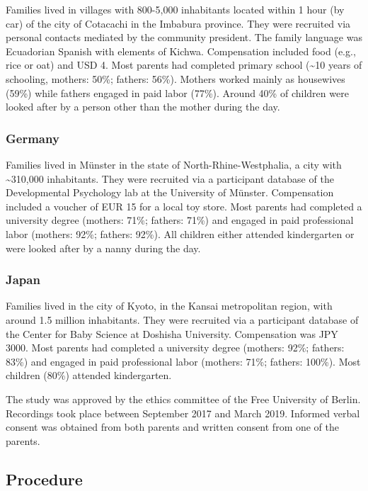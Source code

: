 \documentclass[
  man,floatsintext]{apa6}
\begin{document}
Families lived in villages with 800-5,000 inhabitants located within 1 hour (by car) of the city of Cotacachi in the Imbabura province. They were recruited via personal contacts mediated by the community president. The family language was Ecuadorian Spanish with elements of Kichwa. Compensation included food (e.g., rice or oat) and USD 4. Most parents had completed primary school (\textasciitilde10 years of schooling, mothers: 50\%; fathers: 56\%). Mothers worked mainly as housewives (59\%) while fathers engaged in paid labor (77\%). Around 40\% of children were looked after by a person other than the mother during the day.

\hypertarget{germany}{%
\subsubsection{Germany}\label{germany}}

Families lived in Münster in the state of North-Rhine-Westphalia, a city with \textasciitilde310,000 inhabitants. They were recruited via a participant database of the Developmental Psychology lab at the University of Münster. Compensation included a voucher of EUR 15 for a local toy store. Most parents had completed a university degree (mothers: 71\%; fathers: 71\%) and engaged in paid professional labor (mothers: 92\%; fathers: 92\%). All children either attended kindergarten or were looked after by a nanny during the day.

\hypertarget{japan}{%
\subsubsection{Japan}\label{japan}}

Families lived in the city of Kyoto, in the Kansai metropolitan region, with around 1.5 million inhabitants. They were recruited via a participant database of the Center for Baby Science at Doshisha University. Compensation was JPY 3000. Most parents had completed a university degree (mothers: 92\%; fathers: 83\%) and engaged in paid professional labor (mothers: 71\%; fathers: 100\%). Most children (80\%) attended kindergarten.

The study was approved by the ethics committee of the Free University of Berlin. Recordings took place between September 2017 and March 2019. Informed verbal consent was obtained from both parents and written consent from one of the parents.

\hypertarget{procedure}{%
\subsection{Procedure}\label{procedure}}
\end{document}
